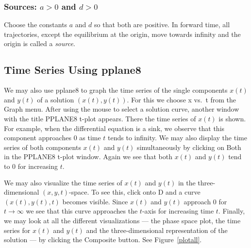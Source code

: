 \documentclass{ximera}
\begin{document}
\subsubsection*{Sources: $a>0$ and $d>0$} 

Choose the constants $a$ and $d$ so that both are positive.
In forward time, all trajectories, except the equilibrium at the
origin, move towards infinity and the origin is called a
{\em source\/}.

\subsection*{Time Series Using {\sf pplane8}} 

We may also use {\sf pplane8} to graph the time series of the
single components $x(t)$ and $y(t)$ of a solution $(x(t),y(t))$.
For this we choose {\sf x vs.\ t} from the {\sf Graph} menu.
After using the mouse to select a solution curve, another window
with the title {\sf PPLANE8 t-plot} appears.  There the time
series of $x(t)$ is shown.  For example, when the differential 
equation is a sink, we observe that this component
approaches $0$ as time $t$ tends to infinity.  We may also
display the time series of both components $x(t)$ and $y(t)$
simultaneously by clicking on {\sf Both} in the {\sf PPLANE8 t-plot} 
window.  Again we see that both $x(t)$ and $y(t)$ tend
to $0$ for increasing $t$.

We may also visualize the time series  of
$x(t)$ and $y(t)$ in the three-dimensional $(x,y,t)$-space.  To
see this, click onto { D} and a curve $(x(t),y(t),t)$ 
becomes visible.  Since $x(t)$ and $y(t)$
approach $0$ for $t\to\infty$ we see that this curve
approaches the $t$-axis for increasing time $t$.  Finally, we
may look at all the different visualizations --- the phase space
plot, the time series for $x(t)$ and $y(t)$ and the
three-dimensional representation of the solution --- by clicking
the {\sf Composite} button.  See Figure~\ref{plotall}.


\begin{figure*}[htb]
     \centerline{%
     }
     \centerline{%
     }
     \caption{{\sf PPLANE8 Display} for \protect\eqref{lin2} with
             $a=2$, $d=-3$ and $x\in [0,25], y\in [0,20]$. The solution
             going through $(1,1)$ is shown. UL: $(t,x(t))$;
	UR: $(t,y(t))$; LL: $(x(t),y(t),t)$; LR: all plots.}
     \label{plotall}
\end{figure*}
\end{document}
